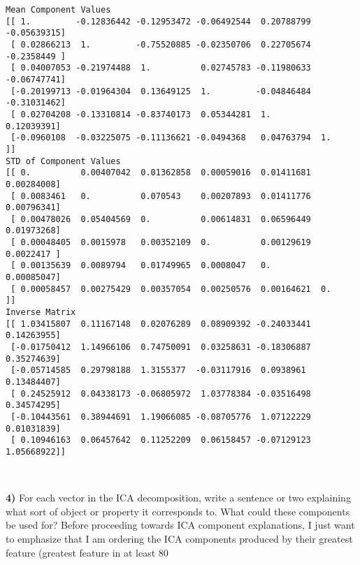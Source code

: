 \documentclass{article}
\begin{document}
    \begin{Verbatim}[commandchars=\\\{\}]
Mean Component Values
[[ 1.         -0.12836442 -0.12953472 -0.06492544  0.20788799 -0.05639315]
 [ 0.02866213  1.         -0.75520885 -0.02350706  0.22705674 -0.2358449 ]
 [ 0.04007053 -0.21974488  1.          0.02745783 -0.11980633 -0.06747741]
 [-0.20199713 -0.01964304  0.13649125  1.         -0.04846484 -0.31031462]
 [ 0.02704208 -0.13310814 -0.83740173  0.05344281  1.          0.12039391]
 [-0.0960108  -0.03225075 -0.11136621 -0.0494368   0.04763794  1.        ]]
STD of Component Values
[[ 0.          0.00407042  0.01362858  0.00059016  0.01411681  0.00284008]
 [ 0.0083461   0.          0.070543    0.00207893  0.01411776  0.00796341]
 [ 0.00478026  0.05404569  0.          0.00614831  0.06596449  0.01973268]
 [ 0.00048405  0.0015978   0.00352109  0.          0.00129619  0.0022417 ]
 [ 0.00135639  0.0089794   0.01749965  0.0008047   0.          0.00085047]
 [ 0.00058457  0.00275429  0.00357054  0.00250576  0.00164621  0.        ]]
Inverse Matrix
[[ 1.03415807  0.11167148  0.02076289  0.08909392 -0.24033441  0.14263955]
 [-0.01750412  1.14966106  0.74750091  0.03258631 -0.18306887  0.35274639]
 [-0.05714585  0.29798188  1.3155377  -0.03117916  0.0938961   0.13484407]
 [ 0.24525912  0.04338173 -0.06805972  1.03778384 -0.03516498  0.34574295]
 [-0.10443561  0.38944691  1.19066085 -0.08705776  1.07122229  0.01031839]
 [ 0.10946163  0.06457642  0.11252209  0.06158457 -0.07129123  1.05668922]]
    \end{Verbatim}

    \begin{center}
    \end{center}
    { \hspace*{\fill} \\}
    
    \textbf{4)} For each vector in the ICA decomposition, write a sentence
or two explaining what sort of object or property it corresponds to.
What could these components be used for?
Before proceeding towards ICA component explanations, I just want to emphasize that I am ordering the ICA components produced by their greatest feature (greatest feature in at least 80%
\end{document}
